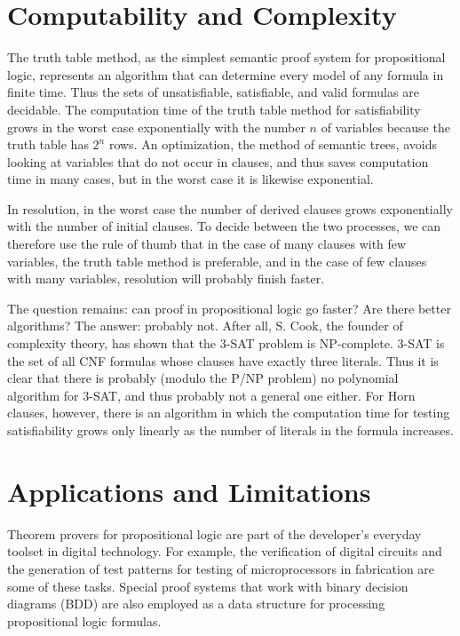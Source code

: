 \documentclass[10pt]{book}
\begin{document}
\section{Computability and Complexity}
The truth table method, as the simplest semantic proof system for propositional logic, represents an algorithm that can determine every model of any formula in finite time. Thus the sets of unsatisfiable, satisfiable, and valid formulas are decidable. The computation time of the truth table method for satisfiability grows in the worst case exponentially with the number $n$ of variables because the truth table has $2^{n}$ rows. An optimization, the method of semantic trees, avoids looking at variables that do not occur in clauses, and thus saves computation time in many cases, but in the worst case it is likewise exponential.

In resolution, in the worst case the number of derived clauses grows exponentially with the number of initial clauses. To decide between the two processes, we can therefore use the rule of thumb that in the case of many clauses with few variables, the truth table method is preferable, and in the case of few clauses with many variables, resolution will probably finish faster.

The question remains: can proof in propositional logic go faster? Are there better algorithms? The answer: probably not. After all, S. Cook, the founder of complexity theory, has shown that the 3-SAT problem is NP-complete. 3-SAT is the set of all CNF formulas whose clauses have exactly three literals. Thus it is clear that there is probably (modulo the P/NP problem) no polynomial algorithm for 3-SAT, and thus probably not a general one either. For Horn clauses, however, there is an algorithm in which the computation time for testing satisfiability grows only linearly as the number of literals in the formula increases.

\section{Applications and Limitations}
Theorem provers for propositional logic are part of the developer's everyday toolset in digital technology. For example, the verification of digital circuits and the generation of test patterns for testing of microprocessors in fabrication are some of these tasks. Special proof systems that work with binary decision diagrams (BDD) are also employed as a data structure for processing propositional logic formulas.
\end{document}

